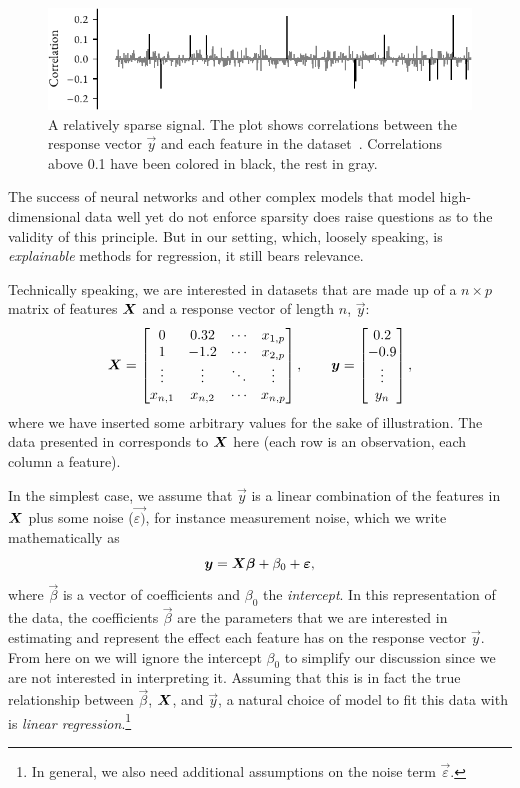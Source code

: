 \begin{figure}[pb]
  \centering
  \includegraphics[]{figures/sparse-signal.pdf}
  \caption{%
    A relatively sparse signal. The plot shows correlations between the response vector \(\vec{y}\) and each feature in the  dataset~\parencite{guyon2004}. Correlations above 0.1 have been colored in black, the rest in gray.
  }
  \label{fig:sparse-signal}
\end{figure}

The success of neural networks and other complex models that model high-dimensional data well yet do not enforce sparsity does raise questions as to the validity of this principle. But in our setting, which, loosely speaking, is \emph{explainable} methods for regression, it still bears relevance.

Technically speaking, we are interested in datasets that are made up of a \(n \times p\) matrix of features \(\boldsymbol{X}\) and a response vector of length \(n\), \(\vec{y}\):
\[
  \boldsymbol{X} = \begin{bmatrix}
    0       & 0.32    & \cdots & x_{1,p} \\
    1       & -1.2    & \cdots & x_{2,p} \\
    \vdots  & \vdots  & \ddots & \vdots  \\
    x_{n,1} & x_{n,2} & \cdots & x_{n,p} \\
  \end{bmatrix},\qquad
  \boldsymbol{y} = \begin{bmatrix}0.2 \\ -0.9 \\ \vdots \\ y_n\end{bmatrix},
\]
where we have inserted some arbitrary values for the sake of illustration. The data presented in  corresponds to \(\boldsymbol{X}\) here (each row is an observation, each column a feature).

In the simplest case, we assume that \(\vec{y}\) is a linear combination of the features in \(\boldsymbol{X}\) plus some noise (\(\vec{\varepsilon)}\), for instance measurement noise, which we write mathematically as
\[
  \boldsymbol{y} = \boldsymbol{X}\boldsymbol{\beta} + \beta_0 + \boldsymbol{\varepsilon},
\]
where \(\vec{\beta}\) is a vector of coefficients and \(\beta_0\) the \emph{intercept}. In this representation of the data, the coefficients \(\vec{\beta}\) are the parameters that we are interested in estimating and represent the effect each feature has on the response vector \(\vec{y}\). From here on we will ignore the intercept \(\beta_0\) to simplify our discussion since we are not interested in interpreting it.
Assuming that this is in fact the true relationship between \(\vec{\beta}\), \(\boldsymbol{X}\), and \(\vec{y}\), a natural choice of model to fit this data with is \emph{linear regression}.\footnote{In general, we also need additional assumptions on the noise term \(\vec{\varepsilon}\).}

